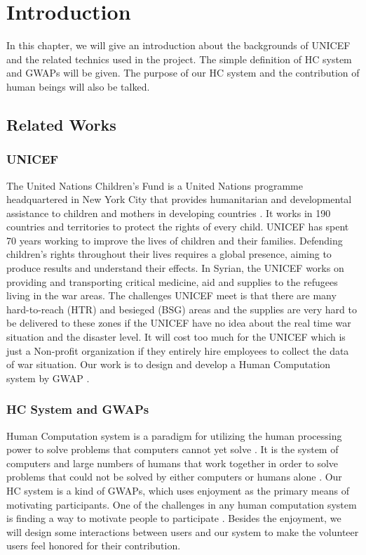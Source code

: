 \section{Introduction}

In this chapter, we will give an introduction about the backgrounds of UNICEF and the related technics 
used in the project. The simple definition of HC system and GWAPs will be given. 
The purpose of our HC system and the contribution of human beings will also be talked.

\subsection{Related Works}

\subsubsection{UNICEF}
The United Nations Children's Fund \cite{unicef1994state} is a United Nations programme headquartered
in New York City that provides humanitarian and developmental assistance to 
children and mothers in developing countries \cite{wiki:UNICEF}.
It works in 190 countries and territories to protect the rights of every child. 
UNICEF has spent 70 years working to improve the lives of children and their families. 
Defending children's rights throughout their lives requires a global presence, 
aiming to produce results and understand their effects. 
In Syrian, the UNICEF works on providing and transporting critical medicine, 
aid and supplies to the refugees living in the war areas. The challenges UNICEF meet is that 
there are many hard-to-reach (HTR) and besieged (BSG) areas and the supplies are 
very hard to be delivered to these zones if the UNICEF have no idea about 
the real time war situation and the disaster level. It will cost too much for the UNICEF 
which is just a Non-profit organization if they entirely hire employees to 
collect the data of war situation. 
Our work is to design and develop a Human Computation system by GWAP \cite{lafourcade2015games}.

\subsubsection{HC System and GWAPs}
Human Computation system is a paradigm for utilizing the human processing power to solve problems that 
computers cannot yet solve \cite{quinn2011human}. 
It is the system of computers and large numbers of humans that work together in order to solve problems that 
could not be solved by either computers or humans alone \cite{quinn2009taxonomy}.
Our HC system is a kind of GWAPs, which uses enjoyment as the primary means of motivating participants. 
One of the challenges in any human computation system is finding a way to motivate people 
to participate \cite{quinn2011human}. 
Besides the enjoyment, we will design some interactions between users and our system to 
make the volunteer users feel honored for their contribution.

